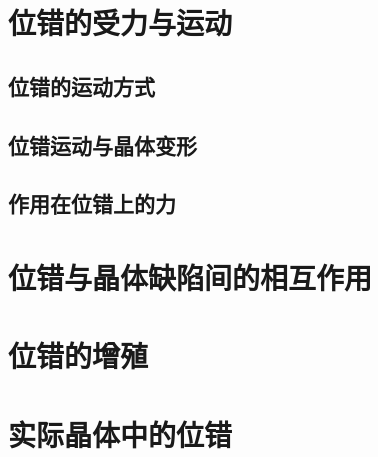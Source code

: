         \section{位错的受力与运动}
            \subsection{位错的运动方式}
            \subsection{位错运动与晶体变形}
            \subsection{作用在位错上的力}

        \section{位错与晶体缺陷间的相互作用}
        \section{位错的增殖}
        \section{实际晶体中的位错}
        